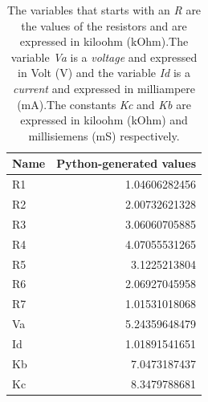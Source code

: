 \begin{table}[h]
  \centering
  \begin{tabular}{|l|r|}
    \hline    
    {\bf Name} & {\bf Python-generated values} \\ \hline
	R1 &  1.04606282456 \\ 
	R2 &  2.00732621328 \\ 
	R3 &  3.06060705885 \\ 
	R4 &  4.07055531265 \\ 
	R5 &  3.1225213804 \\ 
	R6 &  2.06927045958 \\ 
	R7 &  1.01531018068 \\ 
	Va &  5.24359648479 \\ 
	Id &  1.01891541651 \\ 
	Kb &  7.0473187437 \\ 
	Kc &  8.3479788681 \\ 
	\hline
  \end{tabular}
  \caption{The variables that starts with an {\it R} are the values of the resistors 
    and are expressed in  kiloohm  (kOhm).The variable {\it Va}  is a {\it voltage} and expressed in
    Volt (V) and the variable {\it Id}  is a {\it current} and expressed in
   milliampere (mA).The constants {\it Kc} and {\it Kb} are  expressed in
   kiloohm  (kOhm) and millisiemens (mS) respectively. }
  \label{tab:python_values}
\end{table}

\pagebreak


